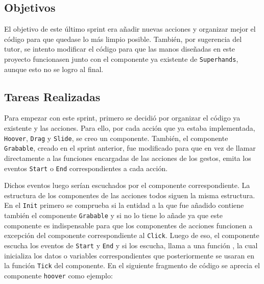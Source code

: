 \documentclass[a4paper, 12pt]{book}
\begin{document}
\subsection{Objetivos}
\label{subsec:objetivo-principal6}
El objetivo de este último sprint era añadir nuevas acciones y organizar mejor el código para que quedase lo más limpio posible. 
También, por sugerencia del tutor, se intento modificar el código para que las manos diseñadas en este proyecto funcionasen junto con el componente ya existente de \texttt{Superhands}, aunque esto no se logro al final. 

\subsection{Tareas Realizadas}
\label{subsec:implementacion6}
Para empezar con este sprint, primero se decidió por organizar el código ya existente y las acciones. Para ello, por cada acción que ya estaba implementada, \texttt{Hoover}, \texttt{Drag} y \texttt{Slide}, se creo un componente. También, el componente \texttt{Grabable}, creado en el sprint anterior, fue modificado para que en vez de llamar directamente a las funciones encargadas de las acciones de los gestos, emita los eventos \texttt{Start} o \texttt{End} correspondientes a cada acción. 

Dichos eventos luego serían escuchados por el componente correspondiente. La estructura de los componentes de las acciones todos siguen la misma estructura. En el \texttt{Init} primero se comprueba si la entidad a la que fue añadido contiene también el componente \texttt{Grabable} y si no lo tiene lo añade ya que este componente es indispensable para que los componentes de acciones funcionen a excepción del componente correspondiente al \texttt{Click}. Luego de eso, el componente escucha los eventos de \texttt{Start} y \texttt{End} y si los escucha, llama a una función
, la cual inicializa los datos o variables correspondientes que posteriormente se usaran en la función \texttt{Tick} del componente. En el siguiente fragmento de código se aprecia el componente \texttt{hoover} como ejemplo:
\end{document}
